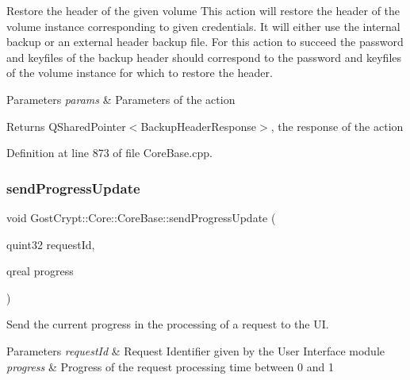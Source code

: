 Restore the header of the given volume This action will restore the header of the volume instance corresponding to given credentials. It will either use the internal backup or an external header backup file. For this action to succeed the password and keyfiles of the backup header should correspond to the password and keyfiles of the volume instance for which to restore the header. 


\begin{DoxyParams}{Parameters}
{\em params} & Parameters of the action \\
\hline
\end{DoxyParams}
\begin{DoxyReturn}{Returns}
Q\+Shared\+Pointer$<$\+Backup\+Header\+Response$>$, the response of the action 
\end{DoxyReturn}


Definition at line 873 of file Core\+Base.\+cpp.

\mbox{\label{class_gost_crypt_1_1_core_1_1_core_base_ad9ad2bcedfbbdaba41aec1767e4bf612}} 
\subsubsection{\texorpdfstring{send\+Progress\+Update}{sendProgressUpdate}}
{\footnotesize\ttfamily void Gost\+Crypt\+::\+Core\+::\+Core\+Base\+::send\+Progress\+Update (\begin{DoxyParamCaption}\item[{quint32}]{request\+Id,  }\item[{qreal}]{progress }\end{DoxyParamCaption})\hspace{0.3cm}{\ttfamily [signal]}}



Send the current progress in the processing of a request to the UI. 


\begin{DoxyParams}{Parameters}
{\em request\+Id} & Request Identifier given by the User Interface module \\
\hline
{\em progress} & Progress of the request processing time between 0 and 1 \\
\hline
\end{DoxyParams}
\mbox{\label{class_gost_crypt_1_1_core_1_1_core_base_a253b279d70554da375f84ed7e2e1a515}} 
